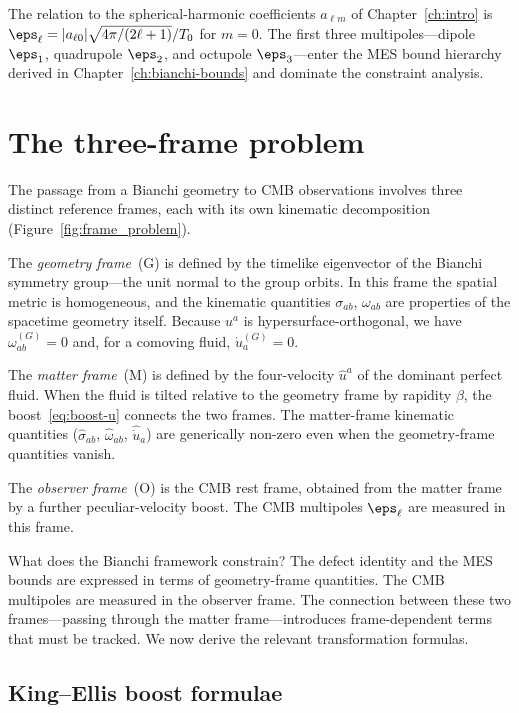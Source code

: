 The relation to the spherical-harmonic coefficients
$a_{\ell m}$ of Chapter~\ref{ch:intro} is
$\eps_\ell = |a_{\ell 0}| \sqrt{4\pi/(2\ell+1)}/T_0$
for $m = 0$.  The first three multipoles---dipole $\eps_1$,
quadrupole $\eps_2$, and octupole $\eps_3$---enter the MES
bound hierarchy derived in
Chapter~\ref{ch:bianchi-bounds} and dominate the constraint
analysis.


\section{The three-frame problem}\label{sec:frame-problem}

The passage from a Bianchi geometry to CMB observations involves
three distinct reference frames, each with its own kinematic
decomposition (Figure~\ref{fig:frame_problem}).

The \emph{geometry frame}~(G) is defined by the timelike
eigenvector of the Bianchi symmetry group---the unit normal to
the group orbits.  In this frame the spatial metric is
homogeneous, and the kinematic quantities $\sigma_{ab}$,
$\omega_{ab}$ are properties of the spacetime geometry itself.
Because $u^a$ is hypersurface-orthogonal, we have
$\omega_{ab}^{(G)} = 0$ and, for a comoving fluid,
$\dot{u}_a^{(G)} = 0$.

The \emph{matter frame}~(M) is defined by the four-velocity
$\hat{u}^a$ of the dominant perfect fluid.  When the fluid
is tilted relative to the geometry frame by rapidity $\beta$,
the boost~\eqref{eq:boost-u} connects the two frames.  The
matter-frame kinematic quantities ($\hat{\sigma}_{ab}$,
$\hat{\omega}_{ab}$, $\hat{\dot{u}}_a$) are generically
non-zero even when the geometry-frame quantities vanish.

The \emph{observer frame}~(O) is the CMB rest frame,
obtained from the matter frame by a further peculiar-velocity
boost.  The CMB multipoles $\eps_\ell$ are measured in this
frame.

What does the Bianchi framework constrain?  The defect identity
and the MES bounds are expressed in terms of geometry-frame
quantities.  The CMB multipoles are measured in the observer
frame.  The connection between these two frames---passing
through the matter frame---introduces frame-dependent terms
that must be tracked.  We now derive the relevant transformation
formulas.


\subsection{King--Ellis boost formulae}\label{sec:king-ellis}

